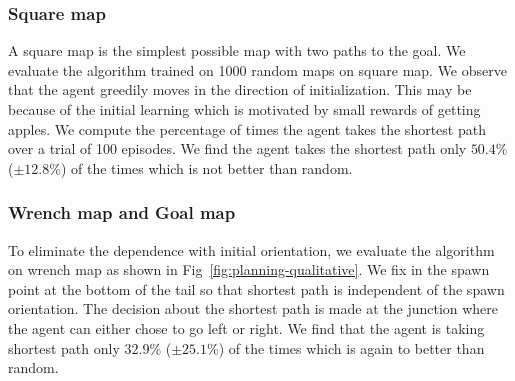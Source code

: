 \subsubsection{Square map}
A square map is the simplest possible map with two paths to the goal.
We evaluate the algorithm trained on 1000 random maps on square map.
We observe that the agent greedily moves in the direction of
initialization.
This may be because of the initial learning which is
motivated by small rewards of getting apples.
We compute the percentage of times the agent takes the shortest path over a trial of 100 episodes.
We find the agent takes the shortest path only $50.4$\% ($\pm 12.8$\%) of the times which is not better than random.

\subsubsection{Wrench map and Goal map}
To eliminate the dependence with initial orientation, we evaluate the algorithm on wrench map as shown in Fig~\ref{fig:planning-qualitative}. We fix in the spawn point at the bottom of the tail so that shortest path is independent of the spawn orientation.
The decision about the shortest path is made at the junction where the agent can either chose to go left or right.
We find that the agent is taking shortest path only $32.9$\% ($\pm 25.1$\%) of the times which is again to better than random.

